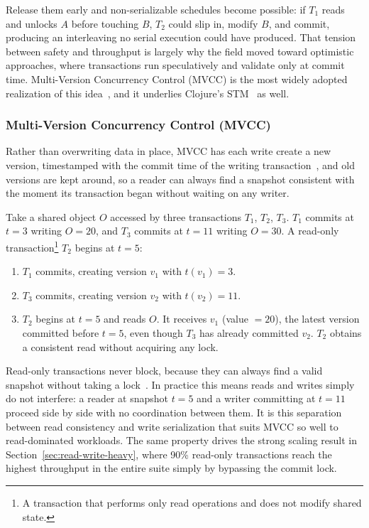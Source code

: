 Release them early and non-serializable schedules become possible:
if $T_1$ reads and unlocks $A$ before touching $B$, $T_2$ could slip in,
modify $B$, and commit, producing an interleaving no serial execution could
have produced. That tension between safety and throughput is largely why the
field moved toward optimistic approaches, where transactions run speculatively
and validate only at commit time. Multi-Version Concurrency Control (MVCC) is
the most widely adopted realization of this idea~\cite{bernstein1983}, and it
underlies Clojure's STM~\cite{clojureRefs} as well.

\subsubsection{Multi-Version Concurrency Control (MVCC)}

Rather than overwriting data in place, MVCC has each write create a new version,
timestamped with the commit time of the writing
transaction~\cite{bernstein1983}, and old versions are kept around, so a
reader can always find a snapshot consistent with the moment its transaction
began without waiting on any writer.

Take a shared object $O$ accessed by three transactions $T_1$, $T_2$, $T_3$.
$T_1$ commits at $t=3$ writing $O=20$, and $T_3$ commits at $t=11$ writing
$O=30$. A read-only transaction\footnote{A transaction that performs only
  read operations and does not modify shared state.} $T_2$ begins at $t=5$:

\begin{enumerate}
  \item $T_1$ commits, creating version $v_1$ with $\mathit{t}(v_1) = 3$.
  \item $T_3$ commits, creating version $v_2$ with $\mathit{t}(v_2) = 11$.
  \item $T_2$ begins at $t=5$ and reads $O$. It receives $v_1$ (value $= 20$),
        the latest version committed before $t=5$, even though $T_3$ has
        already committed $v_2$. $T_2$ obtains a consistent read without
        acquiring any lock.
\end{enumerate}

Read-only transactions never block, because they can always find a valid
snapshot without taking a lock~\cite{bernstein1983}. In practice this means
reads and writes simply do not interfere: a reader at snapshot $t=5$ and a
writer committing at $t=11$ proceed side by side with no coordination between
them. It is this separation between read consistency and write
serialization that suits MVCC so well to read-dominated workloads. The
same property drives the strong scaling result in
Section~\ref{sec:read-write-heavy}, where 90\% read-only transactions reach
the highest throughput in the entire suite simply by bypassing the commit
lock.

